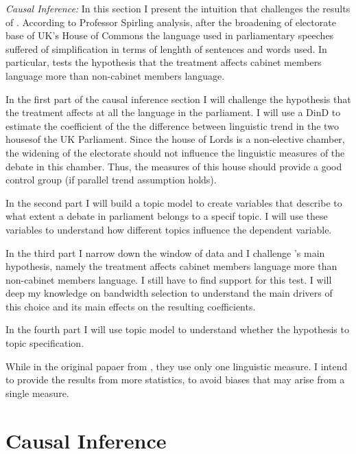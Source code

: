 \vspace*{1em}
\textit{Causal Inference:} In this section I present the intuition that challenges the results of \textcite{spirlingDemocratizationLinguisticComplexity2016}. According to Professor Spirling analysis, after the broadening of electorate base of UK's House of Commons the language used in parliamentary speeches suffered of simplification in terms of lenghth of sentences and words used. In particular, \textcite{spirlingDemocratizationLinguisticComplexity2016} tests the hypothesis that the treatment affects cabinet members language more than non-cabinet members language.

In the first part of the causal inference section I will challenge the hypothesis that the treatment affects at all the language in the parliament. I will use a DinD to estimate the coefficient of the the difference between linguistic trend in the two housesof the UK Parliament. Since the house of Lords is a non-elective chamber, the widening of the electorate should not influence the linguistic measures of the debate in this chamber. Thus, the measures of this house should provide a good control group (if parallel trend assumption holds).

In the second part I will build a topic model to create variables that describe to what extent a debate in parliament belongs to a specif topic. I will use these variables to understand how different topics influence the dependent variable.

In the third part I narrow down the window of data and I challenge \textcite{spirlingDemocratizationLinguisticComplexity2016}'s main hypothesis, namely the treatment affects cabinet members language more than non-cabinet members language.
I still have to find support for this test. I will deep my knowledge on bandwidth selection to understand the main drivers of this choice and its main effects on the resulting coefficients.

In the fourth part I will use topic model to understand whether the hypothesis to topic specification.

While in the original papaer from \textcite{spirlingDemocratizationLinguisticComplexity2016}, they use only one linguistic measure. I intend to provide the results from more statistics, to avoid biases that may arise from a single measure.
 

\section{Causal Inference}

